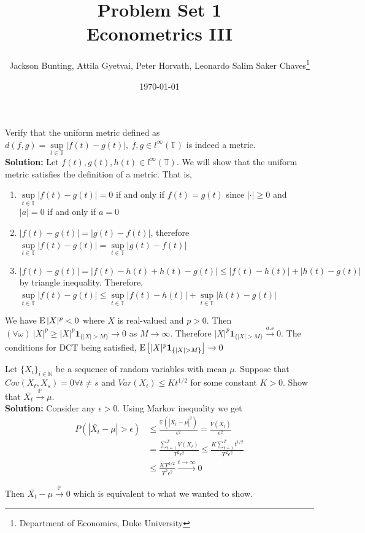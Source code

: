 \documentclass[11pt,letterpaper]{article}                  %
\title{Problem Set 1 \\ \medskip \Large{Econometrics III}}
\author{\Large Jackson Bunting, Attila Gyetvai, Peter Horvath, Leonardo Salim Saker Chaves\footnote{Department of Economics, Duke University}}
\date{\today}
\begin{document}
\maketitle
\begin{problem}
Verify that the uniform metric defined as $d (f, g) = \sup\limits_{t \in \mathbb{T}} |f(t) - g(t)|, \:  f, g \in l^{\infty}(\mathbb{T})$ is indeed a metric. \\

\textbf{Solution:} Let $f(t), g(t), h(t) \in l^{\infty}(\mathbb{T})$. We will show that the uniform metric satisfies the definition of a metric. That is, 
\begin{enumerate}
	\item  $\sup\limits_{t \in \mathbb{T}} |f(t) - g(t)| = 0$ if and only if $f(t) = g(t)$ since $|\cdot| \geq 0$ and $|a| = 0$ if and only if $a = 0$
	\item  $|f(t) - g(t)| = |g(t) - f(t)|$, therefore $\sup\limits_{t \in \mathbb{T}} |f(t) - g(t)| = \sup\limits_{t \in \mathbb{T}} |g(t) - f(t)|$
	\item $|f(t) - g(t)| = |f(t) - h(t) + h(t) - g(t)| \leq |f(t) - h(t)| +  |h(t) - g(t)|$ by triangle inequality. Therefore, $\sup\limits_{t \in \mathbb{T}} |f(t) - g(t)| \leq  \sup\limits_{t \in \mathbb{T}} |f(t) - h(t)| + \sup\limits_{t \in \mathbb{T}} |h(t) - g(t)|$
\end{enumerate}
\end{problem}

\bigskip
\begin{problem}
We have $\operatorname{E}|X|^p < 0$ where $X$ is real-valued and $p > 0$. Then
$(\forall \omega ) \  |X|^p \ge |X|^p \mathbf{1}_{\{|X|>M\}}
\rightarrow 0$ as $M \rightarrow \infty$. Therefore $|X|^p \mathbf{1}_{\{|X|>M\}}
\xrightarrow[]{a.s} 0$. The conditions for DCT being satisfied, $\E \left[|X|^p \mathbf{1}_{\{|X|>M\}}\right]
\rightarrow 0$
\end{problem}

\bigskip
\begin{problem}
Let $\{X_i\}_{i \in \mathbb{N}}$ be a sequence of random variables with mean $\mu$. Suppose that $Cov(X_t,X_s)=0 \forall t\neq s$ and $Var(X_t) \leq Kt^{1/2}$ for some constant $K>0$. Show that $\bar{X_t} \overset{\mathbb{P}}{\rightarrow} \mu$.\\

\textbf{Solution:} Consider any $\epsilon>0$. Using Markov inequality we get
\begin{align*}
P(|\bar{X_t} - \mu| > \epsilon) &\leq \frac{\mathbb{E}( |\bar{X_t} - \mu|^2)}{\epsilon^2} = \frac{V(\bar{X_t})}{\epsilon^2} \\
&= \frac{\sum_{t=1}^T V(X_t)}{T^2 \epsilon^2} \le \frac{K \sum_{t=1}^T t^{1/2}}{T^2 \epsilon^2} \\
&\leq \frac{K T^{3/2}}{T^2 \epsilon^2} \overset{t \to \infty}{\longrightarrow} 0
\end{align*}

Then $\bar{X_t} - \mu \overset{\mathbb{P}}{\rightarrow} 0$ which is equivalent to what we wanted to show.
\end{problem}
\end{document}
